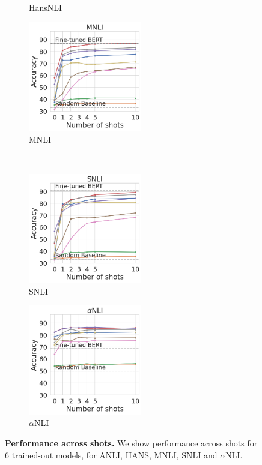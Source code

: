 \begin{figure}[t]
\begin{subfigure}[b]{0.32\textwidth}
    \caption{HansNLI}
    \label{fig:hansnli}
    \end{subfigure}
    \begin{subfigure}[b]{0.32\textwidth}
    \centering
    \includegraphics[height=4.8cm]{figures/mnli_matched}
    \caption{MNLI}
    \label{fig:mnli}
    \end{subfigure}\\
    \centering
    \begin{subfigure}[b]{0.32\textwidth}
    \centering
    \includegraphics[height=4.8cm]{figures/snli}
    \caption{SNLI}
    \label{fig:snli}
    \end{subfigure}
    \begin{subfigure}[b]{0.32\textwidth}
    \centering
    \includegraphics[height=4.8cm]{figures/abductivenli}
    \caption{$\alpha$NLI}
    \label{fig:abductivenli}
    \end{subfigure}
    \caption{\textbf{Performance across shots.} We show performance across shots for 6 trained-out models, for ANLI, HANS, MNLI, SNLI and $\alpha$NLI.}\label{fig:shot_performance}
\end{figure}

